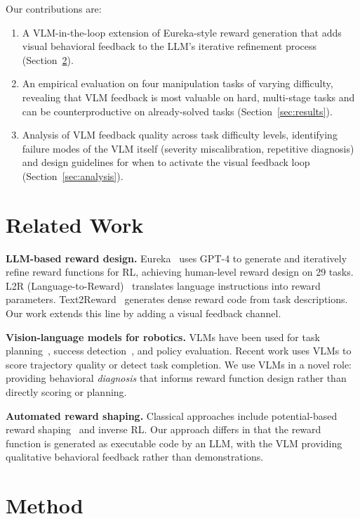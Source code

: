 \documentclass[conference]{IEEEtran}
\begin{document}
Our contributions are:
\begin{enumerate}
  \item A VLM-in-the-loop extension of Eureka-style reward generation that adds
    visual behavioral feedback to the LLM's iterative refinement process
    (Section~\ref{sec:method}).
  \item An empirical evaluation on four manipulation tasks of varying difficulty,
    revealing that VLM feedback is most valuable on hard, multi-stage tasks
    and can be counterproductive on already-solved tasks
    (Section~\ref{sec:results}).
  \item Analysis of VLM feedback quality across task difficulty levels,
    identifying failure modes of the VLM itself (severity miscalibration,
    repetitive diagnosis) and design guidelines for when to activate the visual
    feedback loop (Section~\ref{sec:analysis}).
\end{enumerate}


\section{Related Work}

\textbf{LLM-based reward design.}
Eureka~\cite{eureka} uses GPT-4 to generate and iteratively refine reward
functions for RL, achieving human-level reward design on 29 tasks. L2R
(Language-to-Reward)~\cite{l2r} translates language instructions into reward
parameters. Text2Reward~\cite{text2reward} generates dense reward code from task
descriptions. Our work extends this line by adding a visual feedback channel.

\textbf{Vision-language models for robotics.}
VLMs have been used for task planning~\cite{saycan}, success
detection~\cite{vlm_success}, and policy evaluation. Recent work uses VLMs to
score trajectory quality or detect task completion. We use VLMs in a novel role:
providing behavioral \emph{diagnosis} that informs reward function design rather
than directly scoring or planning.

\textbf{Automated reward shaping.}
Classical approaches include potential-based reward shaping~\cite{pbrs} and
inverse RL. Our approach differs in that the reward function is generated as
executable code by an LLM, with the VLM providing qualitative behavioral
feedback rather than demonstrations.


\section{Method}\label{sec:method}
\end{document}
